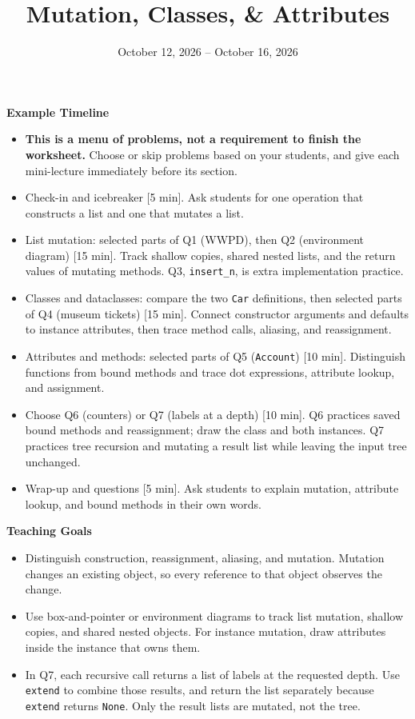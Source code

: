 \documentclass{exam}
\title{Mutation, Classes, \& Attributes}
\date{October 12, 2026 -- October 16, 2026}
\begin{document}
\maketitle

\begin{meta}
\small
\textbf{Example Timeline}
\begin{itemize}
    \item \textbf{This is a menu of problems, not a requirement to finish the worksheet.} Choose or skip problems based on your students, and give each mini-lecture immediately before its section.
    \item Check-in and icebreaker [5 min]. Ask students for one operation that constructs a list and one that mutates a list.
    \item List mutation: selected parts of Q1 (WWPD), then Q2 (environment diagram) [15 min]. Track shallow copies, shared nested lists, and the return values of mutating methods. Q3, \lstinline{insert_n}, is extra implementation practice.
    \item Classes and dataclasses: compare the two \lstinline{Car} definitions, then selected parts of Q4 (museum tickets) [15 min]. Connect constructor arguments and defaults to instance attributes, then trace method calls, aliasing, and reassignment.
    \item Attributes and methods: selected parts of Q5 (\lstinline{Account}) [10 min]. Distinguish functions from bound methods and trace dot expressions, attribute lookup, and assignment.
    \item Choose Q6 (counters) or Q7 (labels at a depth) [10 min]. Q6 practices saved bound methods and reassignment; draw the class and both instances. Q7 practices tree recursion and mutating a result list while leaving the input tree unchanged.
    \item Wrap-up and questions [5 min]. Ask students to explain mutation, attribute lookup, and bound methods in their own words.
\end{itemize}
\textbf{Teaching Goals}
\begin{itemize}
    \item Distinguish construction, reassignment, aliasing, and mutation. Mutation changes an existing object, so every reference to that object observes the change.
    \item Use box-and-pointer or environment diagrams to track list mutation, shallow copies, and shared nested objects. For instance mutation, draw attributes inside the instance that owns them.
    \item In Q7, each recursive call returns a list of labels at the requested depth. Use \lstinline{extend} to combine those results, and return the list separately because \lstinline{extend} returns \lstinline{None}. Only the result lists are mutated, not the tree.

\end{itemize}
\end{meta}
\end{document}
